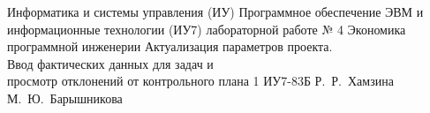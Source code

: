 \documentclass{bmstu}
\begin{document}
\makereporttitle
	{Информатика и системы управления (ИУ)}
	{Программное обеспечение ЭВМ и информационные технологии (ИУ7)}
	{лабораторной работе № 4}
	{Экономика программной инженерии}
	{Актуализация параметров проекта.\\Ввод фактических данных для задач и\\просмотр отклонений от контрольного плана}
	{1}
	{ИУ7-83Б}
	{Р.~Р.~Хамзина}
	{М.~Ю.~Барышникова}


\end{document}
